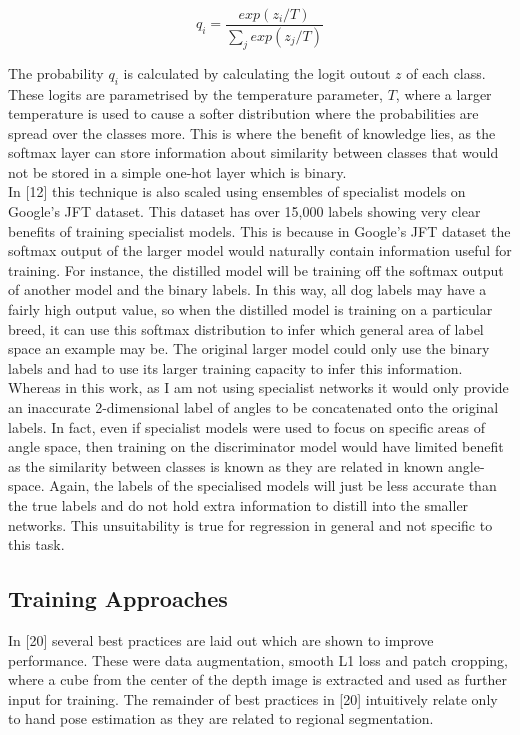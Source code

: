 \documentclass{article}
\begin{document}
\[q_i = \frac{exp(z_i/T)}{\sum_j exp(z_j/T)}\]

The probability $q_i$ is calculated by calculating the logit outout $z$ of each class. These logits are parametrised by the temperature parameter, $T$, where a larger temperature is used to cause a softer distribution where the probabilities are spread over the classes more. This is where the benefit of knowledge lies, as the softmax layer can store information about similarity between classes that would not be stored in a simple one-hot layer which is binary.\\

In [12] this technique is also scaled using ensembles of specialist models on Google's JFT dataset. This dataset has over 15,000 labels showing very clear benefits of training specialist models. This is because in Google's JFT dataset the softmax output of the larger model would naturally contain information useful for training. For instance, the distilled model will be training off the softmax output of another model and the binary labels. In this way, all dog labels may have a fairly high output value, so when the distilled model is training on a particular breed, it can use this softmax distribution to infer which general area of label space an example may be. The original larger model could only use the binary labels and had to use its larger training capacity to infer this information. \\

Whereas in this work, as I am not using specialist networks it would only provide an inaccurate 2-dimensional label of angles to be concatenated onto the original labels. In fact, even if specialist models were used to focus on specific areas of angle space, then training on the discriminator model would have limited benefit as the similarity between classes is known as they are related in known angle-space.  Again, the labels of the specialised models will just be less accurate than the true labels and do not hold extra information to distill into the smaller networks. This unsuitability is true for regression in general and not specific to this task. \\

\subsection{Training Approaches}
In [20] several best practices are laid out which are shown to improve performance. These were data augmentation, smooth L1 loss and patch cropping, where a cube from the center of the depth image is extracted and used as further input for training. The remainder of best practices in [20] intuitively relate only to hand pose estimation as they are related to regional segmentation. \\
\end{document}
